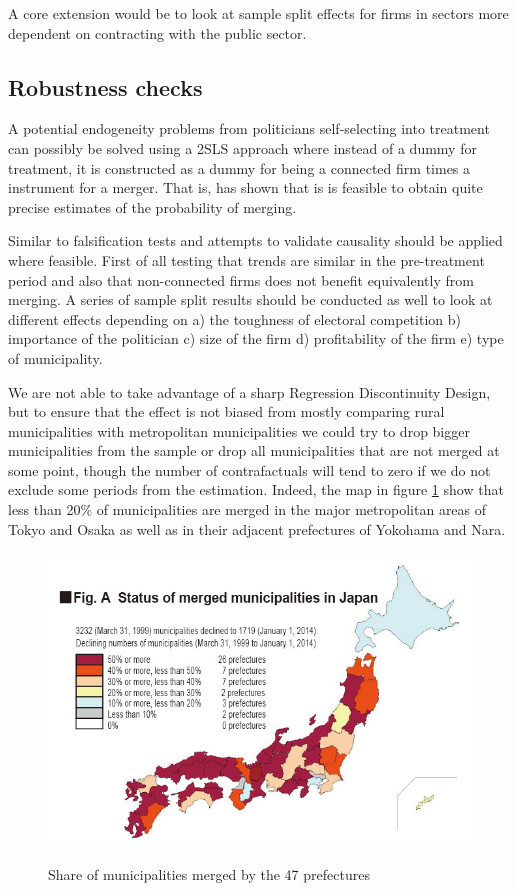 A core extension would be to look at sample split effects for firms in sectors more dependent on contracting with the public sector.

\subsection{Robustness checks}
A potential endogeneity problems from politicians self-selecting into treatment can possibly be solved using a 2SLS approach where instead of a dummy for treatment, it is constructed as a dummy for being a connected firm times a instrument for a merger. That is, \citet{miyazaki2013municipal} has shown that is is feasible to obtain quite precise estimates of the probability of merging.

Similar to \citet{amore2013value} falsification tests and attempts to validate causality should be applied where feasible. First of all testing that trends are similar in the pre-treatment period and also that non-connected firms does not benefit equivalently from merging. A series of sample split results should be conducted as well to look at different effects depending on a) the toughness of electoral competition b) importance of the politician c) size of the firm d) profitability of the firm e) type of municipality.

We are not able to take advantage of a sharp Regression Discontinuity Design, but to ensure that the effect is not biased from mostly comparing rural municipalities with metropolitan municipalities we could try to drop bigger municipalities from the sample or drop all municipalities that are not merged at some point, though the number of contrafactuals will tend to zero if we do not exclude some periods from the estimation. Indeed, the map in figure \ref{fig:prefectures} show that less than 20\% of municipalities are merged in the major metropolitan areas of Tokyo and Osaka as well as in their adjacent prefectures of Yokohama and Nara.
\begin{figure}[H]
  \centering
  \caption{Share of municipalities merged by the 47 prefectures}
    \includegraphics[width= \textwidth]{03_figures/prefectures}
  \label{fig:prefectures}
\end{figure}
